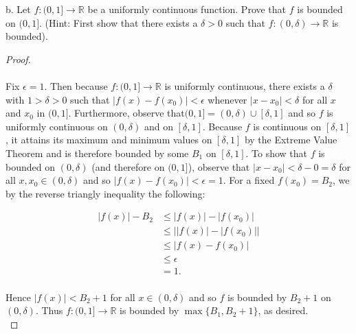     \pagebreak

b.  Let $f:(0, 1] \to \mathbb{R}$ be a uniformly continuous function. Prove that
    $f$ is bounded on $(0, 1]$. (Hint: First show that there exists a
    $\delta > 0$ such that $f:(0, \delta)\to\mathbb{R}$ is bounded). \ \\

    \begin{proof}\ \\\\
        Fix $\epsilon = 1$. Then because $f:(0, 1] \to \mathbb{R}$ is uniformly continuous, there exists a $\delta$ with
        $1 > \delta > 0$ such that $|f(x) - f(x_0)| < \epsilon$ whenever $|x - x_0| < \delta$ for all $x$ and $x_0$ in
        $(0, 1]$. Furthermore, observe that$(0, 1] = (0, \delta) \cup [\delta, 1]$ and so $f$ is uniformly continuous on 
        $(0, \delta)$ and on $[\delta, 1]$. Because $f$ is continuous on $[\delta, 1]$, it attains its maximum
        and minimum values on $[\delta, 1]$ by the Extreme Value Theorem and is therefore bounded by some $B_1$ on 
        $[\delta, 1]$. To show that $f$ is bounded on $(0, \delta)$ (and therefore on $(0, 1]$), observe that 
        $|x - x_0| < \delta - 0 = \delta$ for all $x, x_0 \in (0, \delta)$ and so $|f(x) - f(x_0)| < \epsilon = 1$. For 
        a fixed $f(x_0) = B_2$, we by the reverse triangly inequality the following:

        \begin{align*}
            |f(x)| - B_2 &\le |f(x)| - |f(x_0)| \\
                         &\le \big| |f(x)| - |f(x_0)| \big| \\
                         &\le |f(x) - f(x_0)| \\
                         &\le \epsilon \\
                         &= 1. \\
        \end{align*}

        Hence $|f(x)| < B_2 + 1$ for all $x \in (0, \delta)$ and so $f$ is bounded  by $B_2 + 1$ on $(0, \delta)$. Thus
        $f:(0, 1] \to \mathbb{R}$ is bounded by $\max{\{B_1, B_2 + 1\}}$, as desired.
        \ \\
    \end{proof}

    \pagebreak
